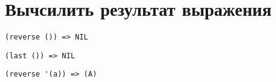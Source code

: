 
\section{Вычсилить результат выражения}

\problem \hfill

\begin{lstlisting}
(reverse ()) => NIL
\end{lstlisting}


\problem \hfill

\begin{lstlisting}
(last ()) => NIL
\end{lstlisting}


\problem \hfill

\begin{lstlisting}
(reverse '(a)) => (A)
\end{lstlisting}
